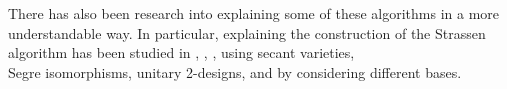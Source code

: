 \documentclass{article}
\theoremstyle{plain}
\theoremstyle{definition}
\theoremstyle{remark}
\begin{document}
There has also been research into explaining some of these algorithms in a more understandable way. In particular, explaining the construction of the Strassen algorithm has been studied in \cite{landsberg2008geometry}, \cite{burichenko2014symmetries}, \cite{grochow2017designing}, \cite{ikenmeyer2019strassen} using secant varieties, \\Segre isomorphisms, unitary 2-designs, and by considering different bases.

\newpage


\end{document}
